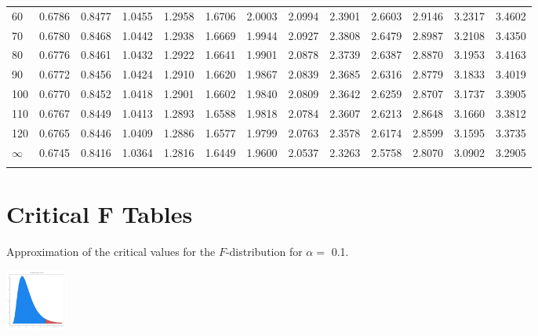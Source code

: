 {\begin{tabular}{m{6pt}|m{24pt}*{11}{m{24pt}}}
 60 & 0.6786 & 0.8477 & 1.0455 & 1.2958 & 1.6706 & 2.0003 & 2.0994 & 2.3901 & 2.6603 & 2.9146 & 3.2317 & 3.4602 \\[1pt] \arrayrulecolor{light-gray}\hline\arrayrulecolor{black}  
 70 & 0.6780 & 0.8468 & 1.0442 & 1.2938 & 1.6669 & 1.9944 & 2.0927 & 2.3808 & 2.6479 & 2.8987 & 3.2108 & 3.4350 \\[1pt] \arrayrulecolor{light-gray}\hline\arrayrulecolor{black}  
 80 & 0.6776 & 0.8461 & 1.0432 & 1.2922 & 1.6641 & 1.9901 & 2.0878 & 2.3739 & 2.6387 & 2.8870 & 3.1953 & 3.4163 \\[1pt] \arrayrulecolor{light-gray}\hline\arrayrulecolor{black}  
 90 & 0.6772 & 0.8456 & 1.0424 & 1.2910 & 1.6620 & 1.9867 & 2.0839 & 2.3685 & 2.6316 & 2.8779 & 3.1833 & 3.4019 \\[1pt] \arrayrulecolor{light-gray}\hline\arrayrulecolor{black}  
100 & 0.6770 & 0.8452 & 1.0418 & 1.2901 & 1.6602 & 1.9840 & 2.0809 & 2.3642 & 2.6259 & 2.8707 & 3.1737 & 3.3905 \\[1pt] \arrayrulecolor{light-gray}\hline\arrayrulecolor{black}  
110 & 0.6767 & 0.8449 & 1.0413 & 1.2893 & 1.6588 & 1.9818 & 2.0784 & 2.3607 & 2.6213 & 2.8648 & 3.1660 & 3.3812 \\[1pt] \arrayrulecolor{light-gray}\hline\arrayrulecolor{black}  
120 & 0.6765 & 0.8446 & 1.0409 & 1.2886 & 1.6577 & 1.9799 & 2.0763 & 2.3578 & 2.6174 & 2.8599 & 3.1595 & 3.3735 \\[1pt] \arrayrulecolor{light-gray}\hline\arrayrulecolor{black}  
$\infty$  & 0.6745 & 0.8416 & 1.0364 & 1.2816 & 1.6449 & 1.9600 & 2.0537 & 2.3263 & 2.5758 & 2.8070 & 3.0902 & 3.2905 \\[5pt] \arrayrulecolor{light-gray}\hline\arrayrulecolor{black}  
\end{tabular}
}


\section{Critical F Tables}

Approximation of the critical values for the $F$-distribution for
$\alpha=$ 0.1. 

 \includegraphics[height=2.0cm]{img/FDistribution}

